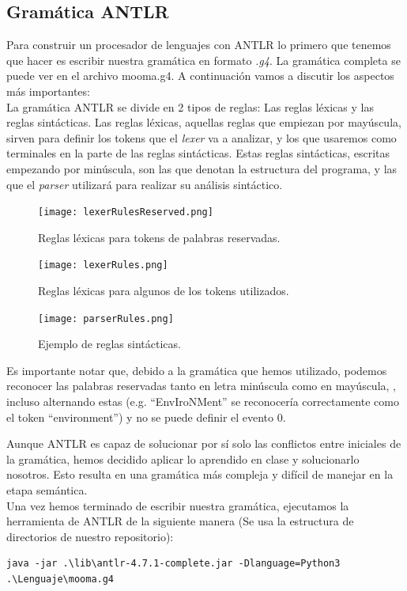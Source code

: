 \documentclass{pre-tfg}
\begin{document}
\subsection{Gramática ANTLR}
Para construir un procesador de lenguajes con ANTLR lo primero que tenemos que hacer es escribir nuestra gramática en formato \textit{.g4}. La gramática completa se puede ver en el archivo mooma.g4. A continuación vamos a discutir los aspectos más importantes:
\\

La gramática ANTLR se divide en 2 tipos de reglas: Las reglas léxicas y las reglas sintácticas. Las reglas léxicas, aquellas reglas que empiezan por mayúscula, sirven para definir los tokens que el \textit{lexer} va a analizar, y los que usaremos como terminales en la parte de las reglas sintácticas. Estas reglas sintácticas, escritas empezando por minúscula, son las que denotan la estructura del programa, y las que el \textit{parser} utilizará para realizar su análisis sintáctico.


\begin{figure}[htb]
	\centering
	\texttt{[image: lexerRulesReserved.png]}
	\caption{Reglas léxicas para tokens de palabras reservadas.}
	\label{fig:lexerRR}
\end{figure}

\begin{figure}[htb]
	\centering
	\texttt{[image: lexerRules.png]}
	\caption{Reglas léxicas para algunos de los tokens utilizados.}
	\label{fig:lexerR}
\end{figure}

\begin{figure}[htb]
	\centering
	\texttt{[image: parserRules.png]}
	\caption{Ejemplo de reglas sintácticas.}
	\label{fig:ParserR}
\end{figure}

Es importante notar que, debido a la gramática que hemos utilizado, podemos reconocer las palabras reservadas tanto en letra minúscula como en mayúscula, , incluso alternando estas (e.g. ``EnvIroNMent'' se reconocería correctamente como el token ``environment'') y no se puede definir el evento 0.

Aunque ANTLR es capaz de solucionar por sí solo las conflictos entre iniciales de la gramática, hemos decidido aplicar lo aprendido en clase y solucionarlo nosotros. Esto resulta en una gramática más compleja y difícil de manejar en la etapa semántica.
\\

Una vez hemos terminado de escribir nuestra gramática, ejecutamos la herramienta de ANTLR de la siguiente manera (Se usa la estructura de directorios de nuestro repositorio):
\begin{lstlisting}[caption=Ejecución de ANTLR.]
java -jar .\lib\antlr-4.7.1-complete.jar -Dlanguage=Python3 .\Lenguaje\mooma.g4
\end{lstlisting}
\end{document}
